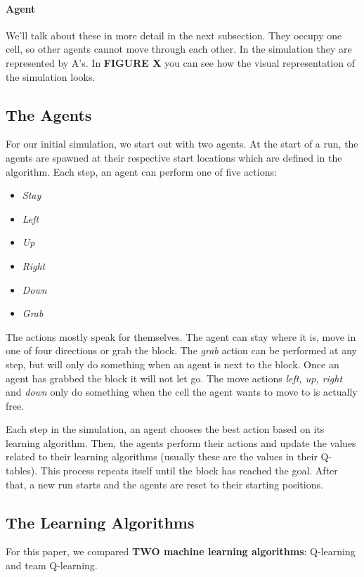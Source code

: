 \paragraph{Agent}
We'll talk about these in more detail in the next subsection. They occupy one cell, so other agents cannot move through each other. In the simulation they are represented by A's.
In \textbf{FIGURE X} you can see how the visual representation of the simulation looks.
\subsection{The Agents}
For our initial simulation, we start out with two agents. At the start of a run, the agents are spawned at their respective start locations which are defined in the algorithm. Each step, an agent can perform one of five actions:
\begin{itemize}
\item \textit{Stay}
\item \textit{Left}
\item \textit{Up}
\item \textit{Right}
\item \textit{Down}
\item \textit{Grab}
\end{itemize}
The actions mostly speak for themselves. The agent can stay where it is, move in one of four directions or grab the block. The \textit{grab} action can be performed at any step, but will only do something when an agent is next to the block. Once an agent has grabbed the block it will not let go. The move actions \textit{left, up, right} and \textit{down} only do something when the cell the agent wants to move to is actually free.

Each step in the simulation, an agent chooses the best action based on its learning algorithm. Then, the agents perform their actions and update the values related to their learning algorithms (usually these are the values in their Q-tables). This process repeats itself until the block has reached the goal. After that, a new run starts and the agents are reset to their starting positions.
\subsection{The Learning Algorithms}
For this paper, we compared \textbf{TWO machine learning algorithms}: Q-learning and team Q-learning.